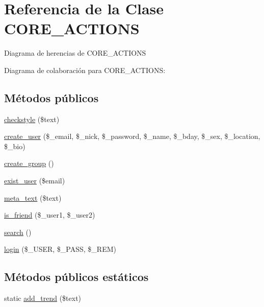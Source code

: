 \hypertarget{classCORE__ACTIONS}{\section{Referencia de la Clase C\-O\-R\-E\-\_\-\-A\-C\-T\-I\-O\-N\-S}
\label{classCORE__ACTIONS}
}


Diagrama de herencias de C\-O\-R\-E\-\_\-\-A\-C\-T\-I\-O\-N\-S


Diagrama de colaboración para C\-O\-R\-E\-\_\-\-A\-C\-T\-I\-O\-N\-S\-:
\subsection*{Métodos públicos}
\begin{DoxyCompactItemize}
\item 
\hyperlink{classCORE__ACTIONS_acb2ef1151b92920b065d417ba6457af9}{checkstyle} (\$text)
\item 
\hyperlink{classCORE__ACTIONS_ab672d86d8a4a35c88f5dc9b5fe58a363}{create\-\_\-user} (\$\-\_\-email, \$\-\_\-nick, \$\-\_\-password, \$\-\_\-name, \$\-\_\-bday, \$\-\_\-sex, \$\-\_\-location, \$\-\_\-bio)
\item 
\hyperlink{classCORE__ACTIONS_a8d6229c412d1772ae355df3ea7a8c7c1}{create\-\_\-group} ()
\item 
\hyperlink{classCORE__ACTIONS_af5353bd19166d507ea0c767d075e41b9}{exist\-\_\-user} (\$email)
\item 
\hyperlink{classCORE__ACTIONS_ae9627d43dbd27db363e9798a228d0455}{meta\-\_\-text} (\$text)
\item 
\hyperlink{classCORE__ACTIONS_a1fdc054f6c0789457f61df1fc6c0a531}{is\-\_\-friend} (\$\-\_\-user1, \$\-\_\-user2)
\item 
\hyperlink{classCORE__ACTIONS_a796bf438724e047aeef18579732a3780}{search} ()
\item 
\hyperlink{classCORE__ACTIONS_aeafe88ea68eb9de27be7e4d37ce621a0}{login} (\$\-\_\-\-U\-S\-E\-R, \$\-\_\-\-P\-A\-S\-S, \$\-\_\-\-R\-E\-M)
\end{DoxyCompactItemize}
\subsection*{Métodos públicos estáticos}
\begin{DoxyCompactItemize}
\item 
static \hyperlink{classCORE__ACTIONS_a2fd42f9fb80794cdd17af79f51427027}{add\-\_\-trend} (\$text)
\end{DoxyCompactItemize}


